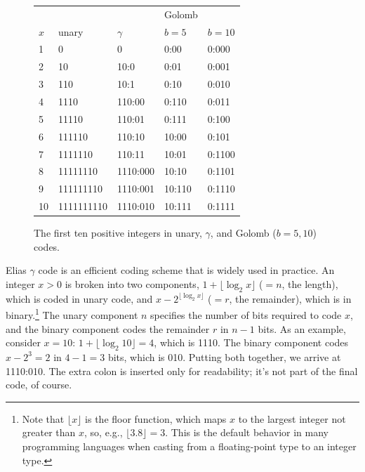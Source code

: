 \begin{figure}[t]
\centering
\begin{tabular}{lllll}
\hline
    &       &          & Golomb \\
$x$ & unary & $\gamma$ & $b=5$ & $b=10$\\
\hline
1  & 0          & 0        & 0:00   & 0:000\\
2  & 10         & 10:0     & 0:01   & 0:001\\
3  & 110        & 10:1     & 0:10   & 0:010\\
4  & 1110       & 110:00   & 0:110  & 0:011\\
5  & 11110      & 110:01   & 0:111  & 0:100\\
6  & 111110     & 110:10   & 10:00  & 0:101\\
7  & 1111110    & 110:11   & 10:01  & 0:1100\\
8  & 11111110   & 1110:000 & 10:10  & 0:1101\\
9  & 111111110  & 1110:001 & 10:110 & 0:1110\\
10 & 1111111110 & 1110:010 & 10:111 & 0:1111\\
\hline
\end{tabular}
\caption{The first ten positive integers in unary, $\gamma$, and
  Golomb ($b=5,10$) codes.}
\label{chapter-indexing:encoding-schemes}
\end{figure}

Elias $\gamma$ code is an efficient coding scheme that is widely used
in practice.  An integer $x>0$ is broken into two components, $1 +
\lfloor \log_2 x \rfloor$ ($=n$, the length), which is coded in unary
code, and $x-2^{\lfloor \log_2 x \rfloor}$ ($=r$, the remainder),
which is in binary.\footnote{Note that $\lfloor x \rfloor$ is the
  floor function, which maps $x$ to the largest integer not greater
  than $x$, so, e.g., $\lfloor 3.8 \rfloor = 3$. This is the default
  behavior in many programming languages when casting from a
  floating-point type to an integer type.}  The unary component $n$
specifies the number of bits required to code $x$, and the binary
component codes the remainder $r$ in $n-1$ bits.  As an example,
consider $x=10$: $1 + \lfloor \log_2 10 \rfloor = 4$, which is 1110.
The binary component codes $x-2^3=2$ in $4-1=3$ bits, which is 010.
Putting both together, we arrive at 1110:010. The extra colon is
inserted only for readability; it's not part of the final code, of
course.

